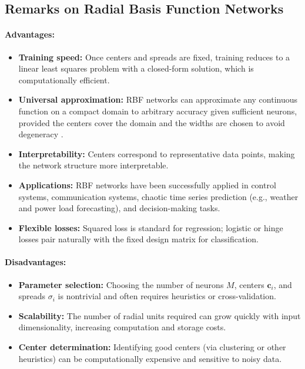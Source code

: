 \subsection{Remarks on Radial Basis Function Networks}
\label{sec:rbf_remarks_on_radial_basis_function_networks}

\paragraph{Advantages:}
\begin{itemize}
    \item \textbf{Training speed:} Once centers and spreads are fixed, training reduces to a linear least squares problem with a closed-form solution, which is computationally efficient.
    \item \textbf{Universal approximation:} RBF networks can approximate any continuous function on a compact domain to arbitrary accuracy given sufficient neurons, provided the centers cover the domain and the widths are chosen to avoid degeneracy \citep{Micchelli1986,ParkSandberg1991}.
    \item \textbf{Interpretability:} Centers correspond to representative data points, making the network structure more interpretable.
    \item \textbf{Applications:} RBF networks have been successfully applied in control systems, communication systems, chaotic time series prediction (e.g., weather and power load forecasting), and decision-making tasks.
    \item \textbf{Flexible losses:} Squared loss is standard for regression; logistic or hinge losses pair naturally with the fixed design matrix for classification.
\end{itemize}

\paragraph{Disadvantages:}
\begin{itemize}
    \item \textbf{Parameter selection:} Choosing the number of neurons \( M \), centers \( \mathbf{c}_i \), and spreads \( \sigma_i \) is nontrivial and often requires heuristics or cross-validation.
    \item \textbf{Scalability:} The number of radial units required can grow quickly with input dimensionality, increasing computation and storage costs.
    \item \textbf{Center determination:} Identifying good centers (via clustering or other heuristics) can be computationally expensive and sensitive to noisy data.
\end{itemize}

